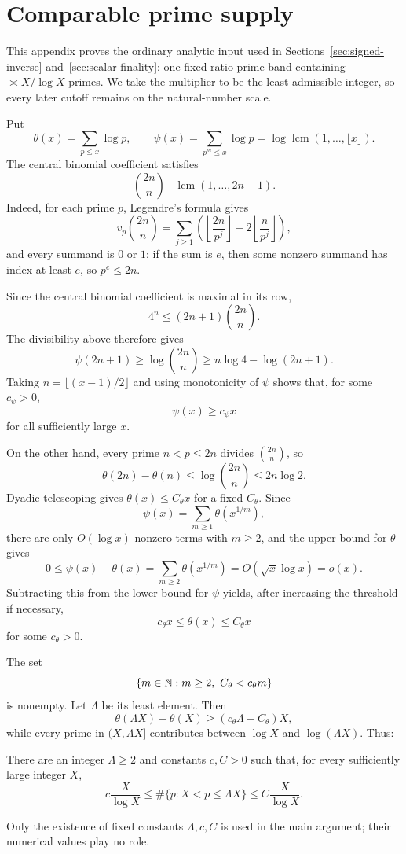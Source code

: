\section{Comparable prime supply}
\label{app:prime-supply}

This appendix proves the ordinary analytic input used in Sections~\ref{sec:signed-inverse} and~\ref{sec:scalar-finality}: one fixed-ratio prime band containing $\asymp X/\log X$ primes.  We take the multiplier to be the least admissible integer, so every later cutoff remains on the natural-number scale.

Put
\[
\theta(x)=\sum_{p\le x}\log p,
\qquad
\psi(x)=\sum_{p^m\le x}\log p
=\log\operatorname{lcm}(1,\ldots,\lfloor x\rfloor).
\]
The central binomial coefficient satisfies
\[
\binom{2n}{n}\mid\operatorname{lcm}(1,\ldots,2n+1).
\]
Indeed, for each prime $p$, Legendre's formula gives
\[
v_p\binom{2n}{n}
=\sum_{j\ge1}
\left(\left\lfloor\frac{2n}{p^j}\right\rfloor
-2\left\lfloor\frac n{p^j}\right\rfloor\right),
\]
and every summand is $0$ or $1$; if the sum is $e$, then some nonzero summand has index at least $e$, so $p^e\le2n$.

Since the central binomial coefficient is maximal in its row,
\[
4^n\le(2n+1)\binom{2n}{n}.
\]
The divisibility above therefore gives
\[
\psi(2n+1)
\ge\log\binom{2n}{n}
\ge n\log4-\log(2n+1).
\]
Taking $n=\lfloor(x-1)/2\rfloor$ and using monotonicity of $\psi$ shows that, for some $c_\psi>0$,
\[
\psi(x)\ge c_\psi x
\]
for all sufficiently large $x$.

On the other hand, every prime $n<p\le2n$ divides $\binom{2n}{n}$, so
\[
\theta(2n)-\theta(n)
\le\log\binom{2n}{n}
\le2n\log2.
\]
Dyadic telescoping gives $\theta(x)\le C_\theta x$ for a fixed $C_\theta$.  Since
\[
\psi(x)=\sum_{m\ge1}\theta(x^{1/m}),
\]
there are only $O(\log x)$ nonzero terms with $m\ge2$, and the upper bound for $\theta$ gives
\[
0\le\psi(x)-\theta(x)
=\sum_{m\ge2}\theta(x^{1/m})
=O(\sqrt x\log x)
=o(x).
\]
Subtracting this from the lower bound for $\psi$ yields, after increasing the threshold if necessary,
\begin{equation}\label{eq:chebyshev-linear}
c_\theta x\le\theta(x)\le C_\theta x
\end{equation}
for some $c_\theta>0$.

The set
\[
\{m\in\N:m\ge2,\ C_\theta<c_\theta m\}
\]
is nonempty.  Let $\Lambda$ be its least element.  Then
\[
\theta(\Lambda X)-\theta(X)
\ge(c_\theta\Lambda-C_\theta)X,
\]
while every prime in $(X,\Lambda X]$ contributes between $\log X$ and $\log(\Lambda X)$.  Thus:

\begin{proposition}\label{prop:prime-band}
There are an integer $\Lambda\ge2$ and constants $c,C>0$ such that, for every sufficiently large integer $X$,
\[
c\frac X{\log X}
\le
\#\{p:X<p\le\Lambda X\}
\le
C\frac X{\log X}.
\]
\end{proposition}

Only the existence of fixed constants $\Lambda,c,C$ is used in the main argument; their numerical values play no role.
